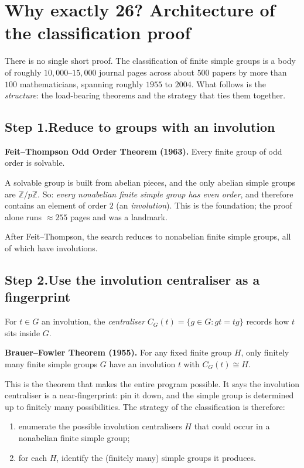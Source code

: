 \documentclass[11pt]{article}
\newcommand{\Z}{\mathbb{Z}}
\begin{document}
\section*{Why exactly 26? Architecture of the classification proof}

There is no single short proof. The classification of finite simple
groups is a body of roughly $10{,}000$--$15{,}000$ journal pages
across about $500$ papers by more than $100$ mathematicians, spanning
roughly $1955$ to $2004$. What follows is the \emph{structure}: the
load-bearing theorems and the strategy that ties them together.

\subsection*{Step 1.\quad Reduce to groups with an involution}

\textbf{Feit--Thompson Odd Order Theorem (1963).} Every finite group
of odd order is solvable.

\noindent A solvable group is built from abelian pieces, and the only
abelian simple groups are $\Z/p\Z$. So: \emph{every nonabelian finite
simple group has even order}, and therefore contains an element of
order $2$ (an \emph{involution}). This is the foundation; the proof
alone runs $\approx 255$ pages and was a landmark.

After Feit--Thompson, the search reduces to nonabelian finite simple
groups, all of which have involutions.

\subsection*{Step 2.\quad Use the involution centraliser as a fingerprint}

For $t \in G$ an involution, the \emph{centraliser}
$C_G(t) = \{g \in G : gt = tg\}$ records how $t$ sits inside $G$.

\textbf{Brauer--Fowler Theorem (1955).} For any fixed finite group
$H$, only finitely many finite simple groups $G$ have an involution
$t$ with $C_G(t) \cong H$.

\noindent This is the theorem that makes the entire program possible.
It says the involution centraliser is a near-fingerprint: pin it
down, and the simple group is determined up to finitely many
possibilities. The strategy of the classification is therefore:

\begin{enumerate}[leftmargin=*, itemsep=2pt]
  \item enumerate the possible involution centralisers $H$ that could
        occur in a nonabelian finite simple group;
  \item for each $H$, identify the (finitely many) simple groups it
        produces.
\end{enumerate}
\end{document}
